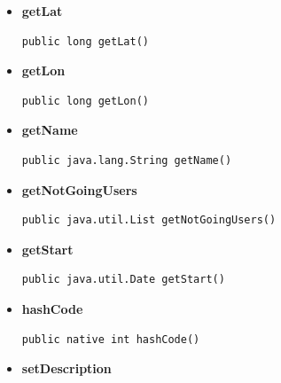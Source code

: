 \documentclass[11pt,a4paper]{report}
\begin{document}
{{{{\begin{itemize}
{}%
\item{ 
\hypertarget{edu.kit.pse17.go_app.PersistenceLayer.GoEntity.getLat()}{{\bf  getLat}\\}
\begin{lstlisting}[frame=none]
public long getLat()\end{lstlisting} %
}%
\item{ 
\hypertarget{edu.kit.pse17.go_app.PersistenceLayer.GoEntity.getLon()}{{\bf  getLon}\\}
\begin{lstlisting}[frame=none]
public long getLon()\end{lstlisting} %
}%
\item{ 
\hypertarget{edu.kit.pse17.go_app.PersistenceLayer.GoEntity.getName()}{{\bf  getName}\\}
\begin{lstlisting}[frame=none]
public java.lang.String getName()\end{lstlisting} %
}%
\item{ 
\hypertarget{edu.kit.pse17.go_app.PersistenceLayer.GoEntity.getNotGoingUsers()}{{\bf  getNotGoingUsers}\\}
\begin{lstlisting}[frame=none]
public java.util.List getNotGoingUsers()\end{lstlisting} %
}%
\item{ 
\hypertarget{edu.kit.pse17.go_app.PersistenceLayer.GoEntity.getStart()}{{\bf  getStart}\\}
\begin{lstlisting}[frame=none]
public java.util.Date getStart()\end{lstlisting} %
}%
\item{ 
\hypertarget{edu.kit.pse17.go_app.PersistenceLayer.GoEntity.hashCode()}{{\bf  hashCode}\\}
\begin{lstlisting}[frame=none]
public native int hashCode()\end{lstlisting} %
}%
\item{ 
\hypertarget{edu.kit.pse17.go_app.PersistenceLayer.GoEntity.setDescription(java.lang.String)}{{\bf  setDescription}\\}
\begin{lstlisting}[frame=none]

\end{lstlisting}}
\end{itemize}}}}}
\end{document}
